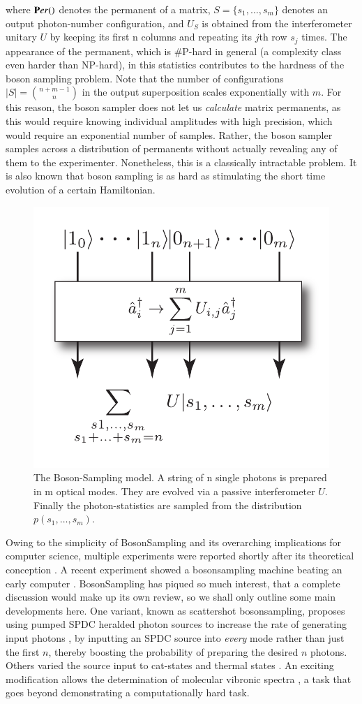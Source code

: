 \documentclass[times,final]{elsarticle}
\begin{document}
where ${\textbf Per}()$ denotes the permanent of a matrix, $S=\{s_1,\dots,s_m\}$ denotes an output photon-number configuration, and $U_S$ is obtained from the interferometer unitary $U$ by keeping its first n columns and repeating its $j$th row $s_j$ times. The appearance of the permanent, which is \#P-hard in general (a complexity class even harder than NP-hard), in this statistics contributes to the hardness of the boson sampling problem. Note that the number of configurations $|S|=\binom{n+m-1}{n}$ in the output superposition scales exponentially with $m$. For this reason, the boson sampler does not let us \emph{calculate} matrix permanents, as this would require knowing individual amplitudes with high precision, which would require an exponential number of samples. Rather, the boson sampler samples across a distribution of permanents without actually revealing any of them to the experimenter. Nonetheless, this is a classically intractable problem. It is also known that boson sampling is as hard as stimulating the short time evolution of a certain Hamiltonian\cite{bib:Peropadre17}.

\begin{figure}[!htb]
\centering
\includegraphics[width=0.3\columnwidth]{BS_model}
\caption{The Boson-Sampling model. A string of n single
photons is prepared in m optical modes. They are evolved
via a passive interferometer $U$. Finally the photon-statistics
are sampled from the distribution $p(s_1,\ldots,s_m)$.
} \label{fig:BosonSampling}	
\end{figure} 

Owing to the simplicity of {\sc BosonSampling} and its overarching implications for computer science, multiple experiments were reported shortly after its theoretical conception \cite{bib:Tillmann13,bib:Spring13, bib:Broome13,bib:Crespi13}. A recent experiment showed a {\sc bosonsampling} machine beating an early computer \cite{bib:WangHe16}.
{\sc BosonSampling} has piqued so much interest, that a complete discussion would make up its own review, so we shall only outline some main developments here. One variant, known as scattershot {\sc bosonsampling}, proposes using pumped SPDC heralded photon sources to increase the rate of generating input photons \cite{bib:Lund14,bib:Bentivegna15}, by inputting an SPDC source into \emph{every} mode rather than just the first $n$, thereby boosting the probability of preparing the desired $n$ photons. Others varied the source input to cat-states \cite{bib:Rohde15} and thermal states \cite{bib:Tamma14_thermal} . An exciting modification allows the determination of molecular vibronic spectra \cite{bib:Huh15}, a task that goes beyond demonstrating a computationally hard task.
\end{document}
